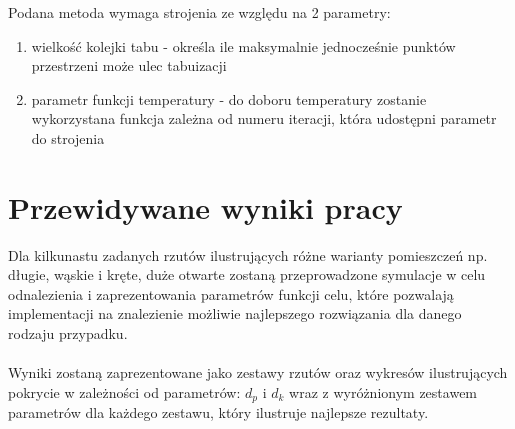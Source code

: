\documentclass[12pt,a4paper]{article}
\begin{document}
Podana metoda wymaga strojenia ze względu na 2 parametry:
\begin{enumerate}
  \item wielkość kolejki tabu - określa ile maksymalnie jednocześnie punktów przestrzeni może ulec tabuizacji
  \item parametr funkcji temperatury - do doboru temperatury zostanie wykorzystana funkcja zależna od numeru iteracji, która udostępni parametr do strojenia
\end{enumerate}
\section{Przewidywane wyniki pracy}
Dla kilkunastu zadanych rzutów ilustrujących różne warianty pomieszczeń np. długie, wąskie i kręte,
duże otwarte zostaną przeprowadzone symulacje w celu odnalezienia i zaprezentowania
parametrów funkcji celu, które pozwalają implementacji na znalezienie możliwie
najlepszego rozwiązania dla danego rodzaju przypadku. \\ \\
Wyniki zostaną zaprezentowane jako zestawy rzutów oraz wykresów
ilustrujących pokrycie w zależności od parametrów: $d_p$ i $d_k$ wraz z wyróżnionym zestawem
parametrów dla każdego zestawu, który ilustruje najlepsze rezultaty.
\end{document}
